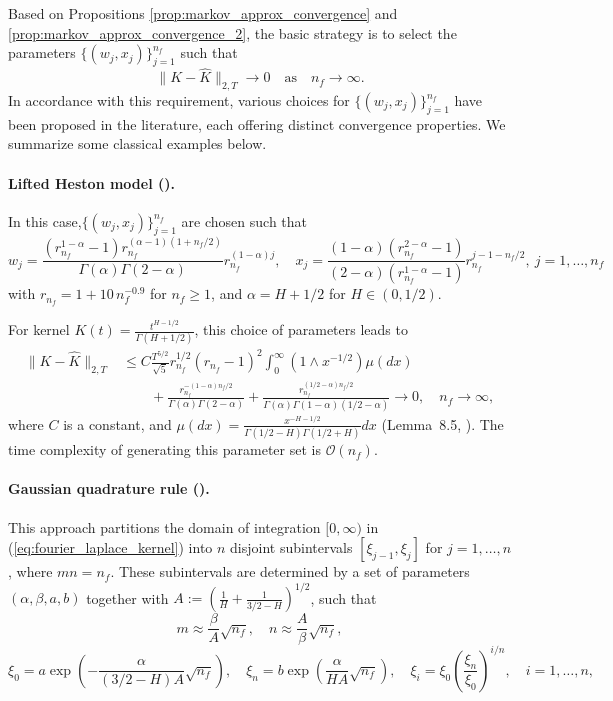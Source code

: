 \documentclass[11pt]{article}%
\theoremstyle{definition}
\begin{document}
Based on Propositions \ref{prop:markov_approx_convergence} and \ref{prop:markov_approx_convergence_2}, the basic strategy is to select the parameters \(\{(w_j, x_j)\}_{j=1}^{n_f}\) such that 
\[
\|K - \widehat{K}\|_{2,T} \to 0 \quad \text{as} \quad n_f \to \infty.
\]
In accordance with this requirement, various choices for \(\{(w_j, x_j)\}_{j=1}^{n_f}\) have been proposed in the literature, each offering distinct convergence properties. We summarize some classical examples below.

\paragraph{Lifted Heston model (\cite{abijaber2018}).} In this case,\(\{(w_j,x_j)\}_{j=1}^{n_f}\) are chosen such that
    \begin{equation}
        w_j = \frac{(r_{n_f}^{1-\alpha} - 1) r_{n_f}^{(\alpha - 1)(1 + n_f/2)}}{\Gamma(\alpha) \Gamma(2 - \alpha)} r_{n_f}^{(1-\alpha)j}, \quad x_j = \frac{(1 - \alpha)( r_{n_f}^{2-\alpha} - 1)}{(2 - \alpha) (r_{n_f}^{1-\alpha} - 1)} r_{n_f}^{j - 1 - n_f/2}, \ j = 1, \dots, n_f \label{eq:parameter_choice_1}
    \end{equation}
    with $r_{n_f} = 1 + 10\,n_f^{-0.9}$ for $n_f \ge 1$, and $\alpha = H + 1/2$ for \(H\in (0,1/2)\).
    
    For kernel \(K(t) = \tfrac{t^{H-1/2}}{\Gamma(H+1/2)}\), this choice of parameters leads to 
    \begin{align}
        \|K - \widehat{K}\|_{2,T} &\le C\frac{T^{5/2}}{\sqrt{5}} r_{n_f}^{1/2} (r_{n_f}-1)^2 \int_0^\infty (1\wedge x^{-1/2})\mu(dx) \nonumber\\
        &\qquad+ \frac{r_{n_f}^{-(1-\alpha)n_f/2}}{\Gamma(\alpha)\Gamma(2-\alpha)} + \frac{r_{n_f}^{(1/2-\alpha)n_f/2}}{\Gamma(\alpha)\Gamma(1-\alpha)(1/2-\alpha)} \to 0,\quad n_f \to \infty,\label{eq:parameter_choice_1_convergence}
    \end{align}
    where \(C\) is a constant, and \(\mu(dx) = \tfrac{x^{-H-1/2}}{\Gamma(1/2-H)\Gamma(1/2+H)}dx\) (Lemma~8.5, \cite{abijaber2018}). The time complexity of generating this parameter set is \(\mathcal{O}(n_f)\).

    \paragraph{Gaussian quadrature rule (\cite{Bayer_Breneis_2023}).} This approach partitions the domain of integration $[0,\infty)$ in (\ref{eq:fourier_laplace_kernel}) into $n$ disjoint subintervals $[\xi_{j-1},\xi_j]$ for $j=1,\ldots,n$, where $mn=n_f$. These subintervals are determined by a set of parameters \((\alpha,\beta,a,b)\) together with \(A := (\tfrac{1}{H}+\tfrac{1}{3/2-H})^{1/2}\), such that 
    \[
    m \approx \frac{\beta}{A}\sqrt{n_f},\quad n \approx \frac{A}{\beta}\sqrt{n_f}, 
    \]
    \[
    \xi_0 = a\exp\left(-\frac{\alpha}{(3/2-H)A}\sqrt{n_f}\right),\quad \xi_n = b\exp\left(\frac{\alpha}{HA}\sqrt{n_f}\right),\quad \xi_i = \xi_0\left(\frac{\xi_n}{\xi_0}\right)^{i/n},\quad i=1,\ldots,n,
    \]
    
\end{document}
